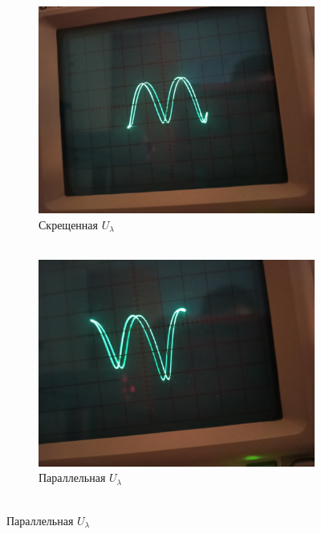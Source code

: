 \documentclass[a4paper, 12pt]{article}
\begin{document}
\begin{figure}[!h]
\begin{subfigure}{0.5\textwidth}
    \includegraphics[scale = 0.15]{intersect2}
    \centering
    \caption{Скрещенная $U_\lambda$\\~}
\end{subfigure}
\begin{subfigure}{0.5\textwidth}
    \includegraphics[scale = 0.15]{parallel2}
    \centering
    \caption{Параллельная $U_\lambda$\\~}
\end{subfigure}


\end{figure}
\end{document}
